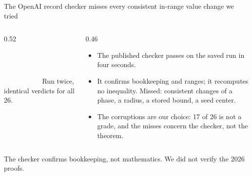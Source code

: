 \documentclass[aspectratio=169,11pt,t]{beamer}
\newcommand{\tg}[2]{{\setlength{\fboxsep}{1.2pt}\colorbox{#1}{\textcolor{white}{\sffamily\bfseries\footnotesize\,#2\,}}}}
\newcommand{\Tcomp}{\tg{cCert}{certified / computed}}
\begin{document}
\begin{frame}{The OpenAI record checker misses every consistent in-range value change we tried}
\begin{columns}[T]
\begin{column}{0.52\textwidth}
\centering
{}\\[0.2cm]
\raggedright\small\Tcomp\ Run twice, identical verdicts for all 26.
\end{column}
\begin{column}{0.46\textwidth}
\begin{itemize}\small\setlength\itemsep{6pt}
\item The published checker passes on the saved run in four seconds.
\item It confirms bookkeeping and ranges; it recomputes no inequality. Missed: consistent changes of a phase, a radius, a stored bound, a seed center.
\item The corruptions are our choice: 17 of 26 is not a grade, and the misses concern the checker, not the theorem.
\end{itemize}
\end{column}
\end{columns}
\vspace{0.25cm}
\raggedright\small\hspace{0.2cm}The checker confirms bookkeeping, not mathematics. We did not verify the 2026 proofs.
\end{frame}
\end{document}
